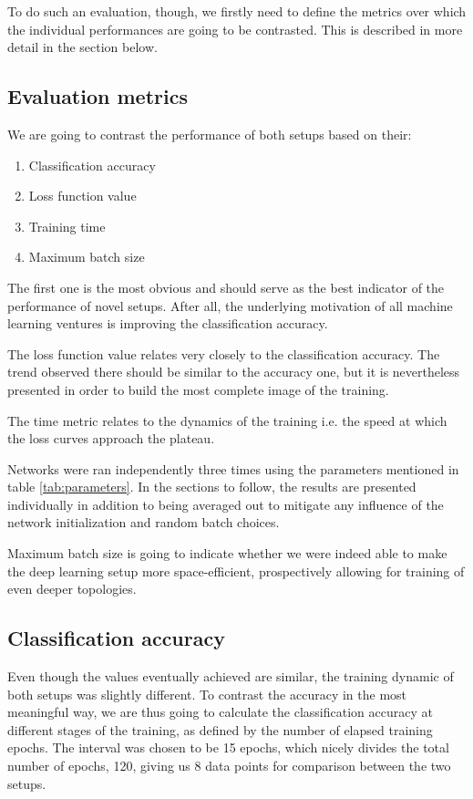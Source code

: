 \documentclass[a4paper, 12pt]{article}
\numberwithin{equation}{section}
\begin{document}
	To do such an evaluation, though, we firstly need to define the metrics over which the individual performances are going to be contrasted. This is described in more detail in the section below.

	\subsection{Evaluation metrics}

	We are going to contrast the performance of both setups based on their:
	\begin{enumerate}
		\item Classification accuracy
		\item Loss function value
		\item Training time
		\item Maximum batch size
	\end{enumerate}

	The first one is the most obvious and should serve as the best indicator of the performance of novel setups. After all, the underlying motivation of all machine learning ventures is improving the classification accuracy.

	The loss function value relates very closely to the classification accuracy. The trend observed there should be similar to the accuracy one, but it is nevertheless presented in order to build the most complete image of the training.

	The time metric relates to the dynamics of the training i.e. the speed at which the loss curves approach the plateau.

	Networks were ran independently three times using the parameters mentioned in table \ref{tab:parameters}. In the sections to follow, the results are presented individually in addition to being averaged out to mitigate any influence of the network initialization and random batch choices.

	Maximum batch size is going to indicate whether we were indeed able to make the deep learning setup more space-efficient, prospectively allowing for training of even deeper topologies.

	\subsection{Classification accuracy}

	Even though the values eventually achieved are similar, the training dynamic of both setups was slightly different. To contrast the accuracy in the most meaningful way, we are thus going to calculate the classification accuracy at different stages of the training, as defined by the number of elapsed training epochs. The interval was chosen to be 15 epochs, which nicely divides the total number of epochs, 120, giving us 8 data points for comparison between the two setups.
\end{document}
